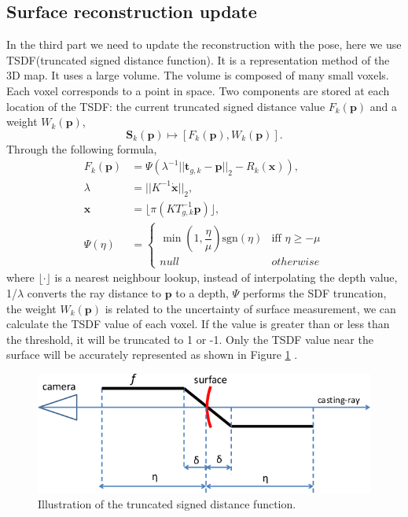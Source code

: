 \documentclass[a4paper,12pt]{article}
\begin{document}
\subsection{Surface reconstruction update}
In the third part we need to update the reconstruction with the pose, here we use TSDF(truncated signed distance function).
It is a representation method of the 3D map. It uses a large volume. The volume is composed of many small voxels. Each voxel corresponds to a point in space. 
Two components are stored at each location of the TSDF: the current truncated signed distance value $F_k(\mathbf{p})$ and a weight $W_k(\mathbf{p})$,
\begin{equation}
	\mathbf{S}_k(\mathbf{p}) \mapsto[F_k(\mathbf{p}),W_k(\mathbf{p})].
	\label{equ15}
\end{equation}
Through the following formula,
\begin{align}
	F_k(\mathbf{p})&=\Psi(\lambda^{-1}||\mathbf{t}_{g,k}-\mathbf{p}||_2-R_k(\mathbf{x})),\\
	\lambda&=||K^{-1}\dot{\mathbf{x}}||_2,\\
	\mathbf{x}&=\lfloor\pi(KT_{g,k}^{-1}\mathbf{p})\rfloor,\\
	\Psi(\eta)&=
	\left\{
		\begin{array}{lr}
		\min(1,\dfrac{\eta}{\mu})\text{sgn}(\eta) & \text{iff } \eta\geq-\mu \\
		null & otherwise
	\end{array}
	\right.
\end{align}
where $\lfloor\cdot\rfloor$ is a nearest neighbour lookup, instead of interpolating the depth value,
1/$\lambda$ converts the ray distance to $\mathbf{p}$ to a depth, $\Psi$ performs the SDF
truncation, the weight $W_k(\mathbf{p})$ is related to the uncertainty of surface measurement,
we can calculate the TSDF value of each voxel.
If the value is greater than or less than the threshold, it will be truncated to 1 or -1. Only the TSDF value near the surface will be accurately represented as shown in Figure \ref{figure5} .
\begin{figure}[h] %
    \centering %
    \includegraphics[scale=0.4]{figure5.png} %
    \caption{Illustration of the truncated signed distance function\cite{Kang2014FastD3}.} %
    \label{figure5} %
\end{figure}%
\end{document}
